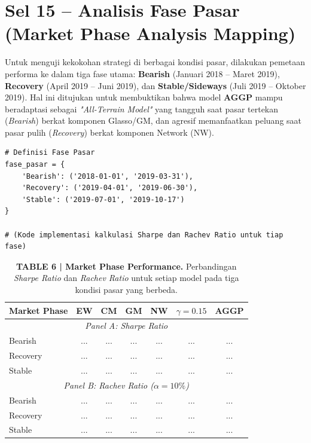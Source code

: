 \documentclass[12pt,a4paper]{article}
\begin{document}
\section{Sel 15 -- Analisis Fase Pasar (Market Phase Analysis Mapping)}
Untuk menguji kekokohan strategi di berbagai kondisi pasar, dilakukan pemetaan performa ke dalam tiga fase utama: \textbf{Bearish} (Januari 2018 -- Maret 2019), \textbf{Recovery} (April 2019 -- Juni 2019), dan \textbf{Stable/Sideways} (Juli 2019 -- Oktober 2019). Hal ini ditujukan untuk membuktikan bahwa model \textbf{AGGP} mampu beradaptasi sebagai \textit{"All-Terrain Model"} yang tangguh saat pasar tertekan (\textit{Bearish}) berkat komponen Glasso/GM, dan agresif memanfaatkan peluang saat pasar pulih (\textit{Recovery}) berkat komponen Network (NW).

\begin{lstlisting}[caption={Kalkulasi Metrik Berdasarkan Fase Pasar}]
# Definisi Fase Pasar
fase_pasar = {
    'Bearish': ('2018-01-01', '2019-03-31'),
    'Recovery': ('2019-04-01', '2019-06-30'),
    'Stable': ('2019-07-01', '2019-10-17')
}

# (Kode implementasi kalkulasi Sharpe dan Rachev Ratio untuk tiap fase)
\end{lstlisting}

\begin{table}[h]
    \centering
    \footnotesize
    \caption{\textbf{TABLE 6 | Market Phase Performance.} Perbandingan \textit{Sharpe Ratio} dan \textit{Rachev Ratio} untuk setiap model pada tiga kondisi pasar yang berbeda.}
    \begin{tabular}{lcccccc}
        \toprule
        Market Phase & EW & CM & GM & NW & $\gamma=0.15$ & AGGP \\
        \midrule
        \multicolumn{7}{c}{\textit{Panel A: Sharpe Ratio}} \\
        Bearish & ... & ... & ... & ... & ... & ... \\
        Recovery & ... & ... & ... & ... & ... & ... \\
        Stable & ... & ... & ... & ... & ... & ... \\
        \midrule
        \multicolumn{7}{c}{\textit{Panel B: Rachev Ratio ($\alpha=10\%$)}} \\
        Bearish & ... & ... & ... & ... & ... & ... \\
        Recovery & ... & ... & ... & ... & ... & ... \\
        Stable & ... & ... & ... & ... & ... & ... \\
        \bottomrule
    \end{tabular}
\end{table}
\end{document}
